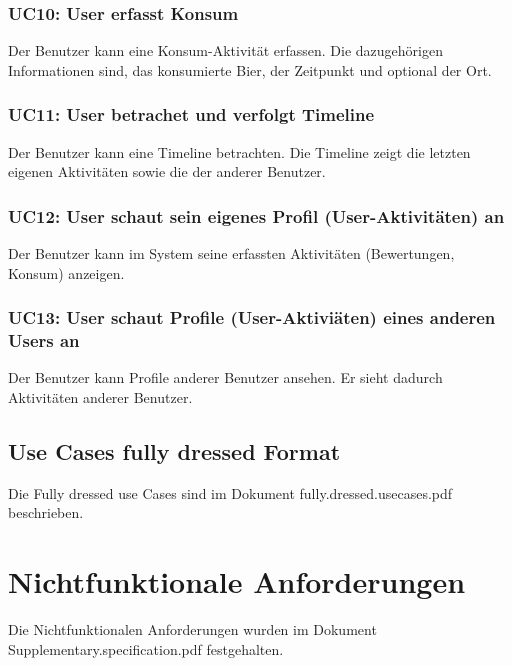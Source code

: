 \documentclass[10pt,a4paper]{scrartcl}
\begin{document}
\subsubsection*{UC10: User erfasst Konsum}
Der Benutzer kann eine Konsum-Aktivität erfassen. Die dazugehörigen Informationen sind, das konsumierte Bier, der Zeitpunkt und optional der Ort.
\subsubsection*{UC11: User betrachet und verfolgt Timeline}
Der Benutzer kann eine Timeline betrachten. Die Timeline zeigt die letzten eigenen Aktivitäten sowie die der anderer Benutzer.
\subsubsection*{UC12: User schaut sein eigenes Profil (User-Aktivitäten) an}
Der Benutzer kann im System seine erfassten Aktivitäten (Bewertungen, Konsum) anzeigen.
\subsubsection*{UC13: User schaut Profile (User-Aktiviäten) eines anderen Users an}
Der Benutzer kann Profile anderer Benutzer ansehen. Er sieht dadurch Aktivitäten anderer Benutzer.
\subsection{Use Cases fully dressed Format}
Die Fully dressed use Cases sind im Dokument fully.dressed.usecases.pdf beschrieben.
\section{Nichtfunktionale Anforderungen}
Die Nichtfunktionalen Anforderungen wurden im Dokument Supplementary.specification.pdf festgehalten.
\end{document}
